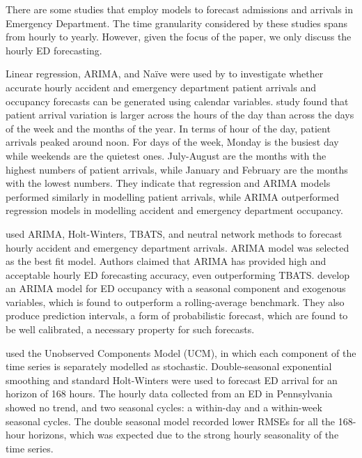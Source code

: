 \documentclass[]{elsarticle} %
\begin{document}
There are some studies that employ models to forecast admissions and arrivals in Emergency Department. The time granularity considered by these studies spans from hourly to yearly. However, given the focus of the paper, we only discuss the hourly ED forecasting.

Linear regression, ARIMA, and Naïve were used by \citet{hertzum2017forecasting} to investigate whether accurate hourly accident and emergency department patient arrivals and occupancy forecasts can be generated using calendar variables. \citet{hertzum2017forecasting} study found that patient arrival variation is larger across the hours of the day than across the days of the week and the months of the year. In terms of hour of the day, patient arrivals peaked around noon. For days of the week, Monday is the busiest day while weekends are the quietest ones. July-August are the months with the highest numbers of patient arrivals, while January and February are the months with the lowest numbers. They indicate that regression and ARIMA models performed similarly in modelling patient arrivals, while ARIMA outperformed regression models in modelling accident and emergency department occupancy.

\citet{choudhury2020forecasting} used ARIMA, Holt-Winters, TBATS, and neutral network methods to forecast hourly accident and emergency department arrivals. ARIMA model was selected as the best fit model. Authors claimed that ARIMA has provided high and acceptable hourly ED forecasting accuracy, even outperforming TBATS. \citet{Cheng2021} develop an ARIMA model for ED occupancy with a seasonal component and exogenous variables, which is found to outperform a rolling-average benchmark. They also produce prediction intervals, a form of probabilistic forecast, which are found to be well calibrated, a necessary property for such forecasts.

\citet{morzuch2006forecasting} used the Unobserved Components Model (UCM), in which each component of the time series is separately modelled as stochastic. Double-seasonal exponential smoothing and standard Holt-Winters were used to forecast ED arrival for an horizon of 168 hours. The hourly data collected from an ED in Pennsylvania showed no trend, and two seasonal cycles: a within-day and a within-week seasonal cycles. The double seasonal model recorded lower RMSEs for all the 168-hour horizons, which was expected due to the strong hourly seasonality of the time series.
\end{document}
